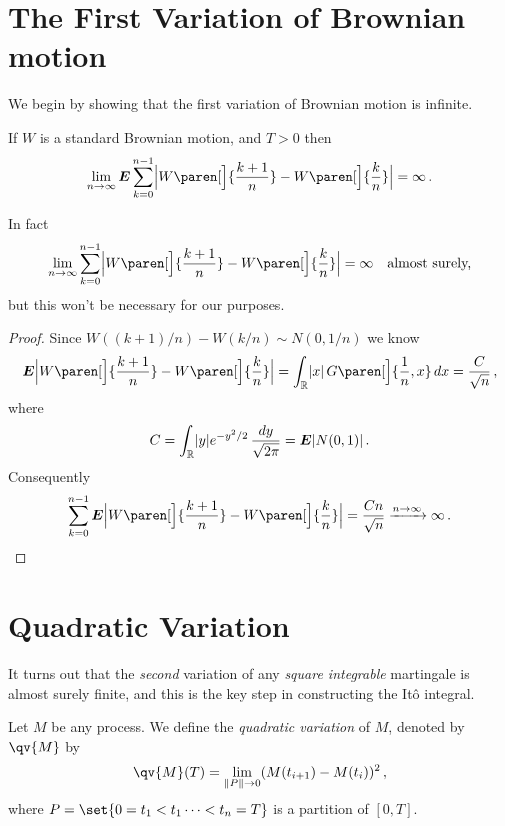 \section{The First Variation of Brownian motion}

We begin by showing that the first variation of Brownian motion is infinite.
\begin{proposition}
  If $W$ is a standard Brownian motion, and $T > 0$ then
  \begin{equation*}
    \lim_{n \to \infty} \E \sum_{k=0}^{n-1}
      \abs[\Big]{
	W\paren[\Big]{\frac{k+1}{n}}
	- W\paren[\Big]{\frac{k}{n}}
      } = \infty\,.
  \end{equation*}
\end{proposition}
\begin{remark}
  In fact
  \begin{equation*}
    \lim_{n \to \infty} \sum_{k=0}^{n-1}
      \abs[\Big]{
	W\paren[\Big]{\frac{k+1}{n}}
	- W\paren[\Big]{\frac{k}{n}}
      } = \infty
      \quad\text{almost surely,}
  \end{equation*}
  but this won't be necessary for our purposes.
\end{remark}
\begin{proof}
  Since $W( (k+1)/n ) - W(k/n) \sim N(0, 1/n)$ we know
  \begin{equation*}
    \E \abs[\Big]{
	W\paren[\Big]{\frac{k+1}{n}}
	- W\paren[\Big]{\frac{k}{n}}
      }
      = \int_\R \abs{x} \, G\paren[\Big]{ \frac{1}{n}, x } \, dx
      = \frac{C}{\sqrt{n}}\,,
  \end{equation*}
  where
  \begin{equation*}
     C = \int_{\mathbb{R}} \lvert y\rvert e^{-y^2/2} \, \frac{dy}{\sqrt{2\pi}}
      = \bm{E} \lvert N(0, 1)\rvert \,.
  \end{equation*}
  Consequently
  \begin{equation*}
    \sum_{k=0}^{n-1}
      \E
      \abs[\Big]{
	W\paren[\Big]{\frac{k+1}{n}}
	- W\paren[\Big]{\frac{k}{n}}
      }
      = \frac{C n}{\sqrt{n}}
      \xrightarrow{n \to \infty} \infty\,.
      \qedhere
  \end{equation*}
\end{proof}

\section{Quadratic Variation}

It turns out that the \emph{second} variation of any \emph{square integrable} martingale is almost surely finite, and this is the key step in constructing the It\^o integral.
\begin{definition}
  Let $M$ be any process.
  We define the \emph{quadratic variation} of $M$, denoted by $\qv{M}$ by
  \begin{equation*}
    \qv{M}(T) = \lim_{\norm{P} \to 0} (M(t_{i+1}) - M(t_i))^2\,,
  \end{equation*}
  where $P = \set{0 = t_1 < t_1 \cdots < t_n = T}$ is a partition of $[0, T]$.
\end{definition}

